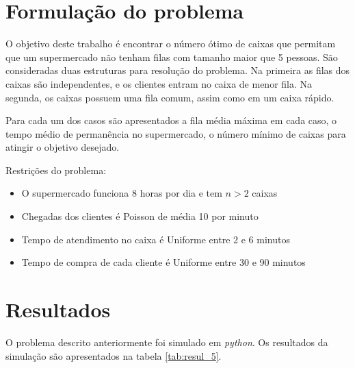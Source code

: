 \chapter{Formulação do problema}
O objetivo deste trabalho é encontrar o número ótimo
de caixas que permitam que um supermercado não tenham filas
com tamanho maior que 5 pessoas. São consideradas duas estruturas
para resolução do problema. Na primeira as filas dos caixas são
independentes, e os clientes entram no caixa de menor fila.
Na segunda, os caixas possuem uma fila comum, assim como em um
caixa rápido.

Para cada um dos casos são apresentados a fila média máxima em cada
caso, o tempo médio de permanência no supermercado, o número mínimo
de caixas para atingir o objetivo desejado.

Restrições do problema:
\begin{itemize}
  \item O supermercado funciona 8 horas por dia e tem $n>2$ caixas
  \item Chegadas dos clientes é Poisson de média 10 por minuto
  \item Tempo de atendimento no caixa é Uniforme entre 2 e 6 minutos
  \item Tempo de compra de cada cliente é Uniforme entre 30 e 90 minutos
\end{itemize}

\chapter{Resultados}\label{cap:resul}
O problema descrito anteriormente foi simulado em \textit{python}. Os resultados
da simulação são apresentados na tabela \ref{tab:resul_5}.



